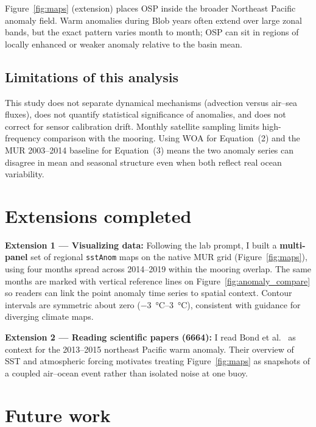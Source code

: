 \documentclass[11pt,letterpaper]{article}
\begin{document}
Figure~\ref{fig:maps} (extension) places OSP inside the broader Northeast Pacific anomaly field. Warm anomalies during Blob years often extend over large zonal bands, but the exact pattern varies month to month; OSP can sit in regions of locally enhanced or weaker anomaly relative to the basin mean.

\subsection{Limitations of this analysis}
This study does not separate dynamical mechanisms (advection versus air--sea fluxes), does not quantify statistical significance of anomalies, and does not correct for sensor calibration drift. Monthly satellite sampling limits high-frequency comparison with the mooring. Using WOA for Equation~(2) and the MUR 2003--2014 baseline for Equation~(3) means the two anomaly series can disagree in mean and seasonal structure even when both reflect real ocean variability.

\section{Extensions completed}

\textbf{Extension 1 --- Visualizing data:} Following the lab prompt, I built a \textbf{multi-panel} set of regional \texttt{sstAnom} maps on the native MUR grid (Figure~\ref{fig:maps}), using four months spread across 2014--2019 within the mooring overlap. The same months are marked with vertical reference lines on Figure~\ref{fig:anomaly_compare} so readers can link the point anomaly time series to spatial context. Contour intervals are symmetric about zero (\SIrange{-3}{+3}{\degreeCelsius}), consistent with guidance for diverging climate maps.

\textbf{Extension 2 --- Reading scientific papers (6664):} I read Bond et al.\ \cite{bond2015} as context for the 2013--2015 northeast Pacific warm anomaly. Their overview of SST and atmospheric forcing motivates treating Figure~\ref{fig:maps} as snapshots of a coupled air--ocean event rather than isolated noise at one buoy.


\section{Future work}
\end{document}
